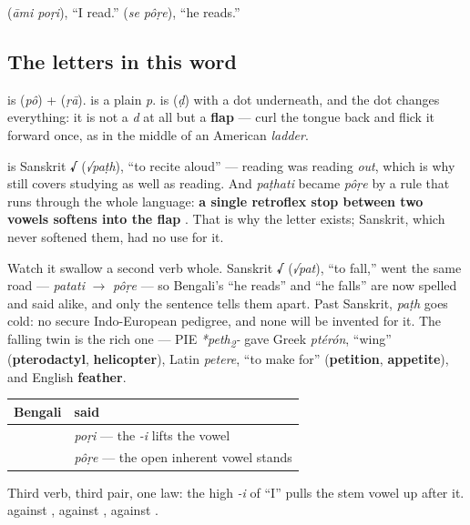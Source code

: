   (\emph{āmi poṛi}), \textquotedblleft{}I read.\textquotedblright{}   (\emph{se pôṛe}), \textquotedblleft{}he reads.\textquotedblright{}

\subsection*{The letters in this word}
\textbf{} is \textbf{} (\emph{pô}) + \textbf{} (\emph{ṛā}). \textbf{} is a plain \emph{p}. \textbf{} is \textbf{} (\emph{ḍ}) with a dot underneath, and the dot changes everything: it is not a \emph{d} at all but a \textbf{flap} — curl the tongue back and flick it forward once, as in the middle of an American \emph{ladder}.

\begin{cousinweb}
\textbf{} is Sanskrit \textbf{√} (\emph{√paṭh}), \textquotedblleft{}to recite aloud\textquotedblright{} — reading was reading \emph{out}, which is why  still covers studying as well as reading. And \emph{paṭhati} became \emph{pôṛe} by a rule that runs through the whole language: \textbf{a single retroflex stop between two vowels softens into the flap }. That is why the letter exists; Sanskrit, which never softened them, had no use for it.

Watch it swallow a second verb whole. Sanskrit \textbf{√} (\emph{√pat}), \textquotedblleft{}to fall,\textquotedblright{} went the same road — \emph{patati} $\to$ \emph{pôṛe} — so Bengali's \textquotedblleft{}he reads\textquotedblright{} and \textquotedblleft{}he falls\textquotedblright{} are now spelled and said alike, and only the sentence tells them apart. Past Sanskrit, \emph{paṭh} goes cold: no secure Indo-European pedigree, and none will be invented for it. The falling twin is the rich one — PIE \emph{*peth\textsubscript{2}-} gave Greek \emph{ptérón}, \textquotedblleft{}wing\textquotedblright{} (\textbf{pterodactyl}, \textbf{helicopter}), Latin \emph{petere}, \textquotedblleft{}to make for\textquotedblright{} (\textbf{petition}, \textbf{appetite}), and English \textbf{feather}.
\end{cousinweb}

\begin{grammarlens}[title={Grammar Lens: the harmony, on a third vowel}]
\noindent
\begin{tabularx}{\linewidth}{@{}>{\raggedright\arraybackslash}X>{\raggedright\arraybackslash}X@{}}
\toprule
\textbf{Bengali} & \textbf{said} \\
\midrule
\bn{আমি} \bn{পড়ি} & \emph{poṛi} — the \emph{-i} lifts the vowel \\
\bn{সে} \bn{পড়ে} & \emph{pôṛe} — the open inherent vowel stands \\
\bottomrule
\end{tabularx}

Third verb, third pair, one law: the high \emph{-i} of \textquotedblleft{}I\textquotedblright{} pulls the stem vowel up after it.  against ,  against ,  against .
\end{grammarlens}

